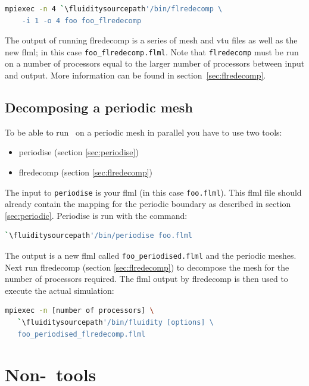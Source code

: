 \begin{lstlisting}[language=bash]
mpiexec -n 4 `\fluiditysourcepath'/bin/flredecomp \
    -i 1 -o 4 foo foo_flredecomp
\end{lstlisting}

The output of running flredecomp is a series of mesh and vtu files as well
as the new flml; in this case \lstinline+foo_flredecomp.flml+. 
Note that \lstinline[language=bash]+flredecomp+ must be run on a number of processors equal to the larger number of processors between input and output.
More information can be found in section~\ref{sec:flredecomp}.

\subsection{Decomposing a periodic mesh}
\label{sec:decomposing_meshes_periodise}

To be able to run \fluidity\ on a periodic mesh in parallel you have to use
two tools:

\begin{itemize}
\item periodise (section \ref{sec:periodise})
\item flredecomp (section \ref{sec:flredecomp})
\end{itemize}

The input to \lstinline+periodise+ is your flml (in this case
\lstinline{foo.flml}). This flml file should already contain the mapping for
the periodic boundary as described in section
\ref{sec:periodic}. Periodise is run with the command:

\begin{lstlisting}[language=bash]
`\fluiditysourcepath'/bin/periodise foo.flml
\end{lstlisting}

The output is a new flml called \lstinline+foo_periodised.flml+ and the
periodic meshes. Next run flredecomp (section \ref{sec:flredecomp}) to decompose the mesh for the number of processors
required. The flml output by flredecomp is then used to execute the actual simulation:

\begin{lstlisting}[language=bash]
mpiexec -n [number of processors] \
   `\fluiditysourcepath'/bin/fluidity [options] \
   foo_periodised_flredecomp.flml
\end{lstlisting}

\section{Non-\fluidity\ tools}

